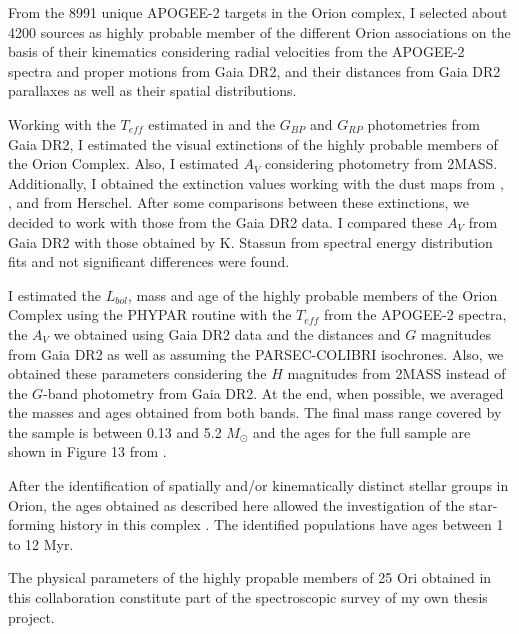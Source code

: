 \documentclass[12pt]{article}
\begin{document}
From the 8991 unique APOGEE-2 targets in the Orion complex, I selected about 4200 sources as highly probable member of the different Orion associations on the basis of their kinematics considering radial velocities from the APOGEE-2 spectra \citep{Kounkel2018} and proper motions from Gaia DR2, and their distances from Gaia DR2 parallaxes as well as their spatial distributions.

Working with the $T_{eff}$ estimated in \citet{Kounkel2018} and the $G_{BP}$ and $G_{RP}$ photometries from Gaia DR2, I estimated the visual extinctions of the highly probable members of the Orion Complex. Also, I estimated $A_V$ considering photometry from 2MASS. Additionally, I obtained the extinction values working with the dust maps from \citet{Schlegel1998}, \citet{Gontcharov2017}, \citet{Green2018} and from Herschel. After some comparisons between these extinctions, we decided to work with those from the Gaia DR2 data. I compared these $A_V$ from Gaia DR2 with those obtained by K. Stassun from spectral energy distribution fits and not significant differences were found.

I estimated the $L_{bol}$, mass and age of the highly probable members of the Orion Complex using the PHYPAR routine with the $T_{eff}$ from the APOGEE-2 spectra, the $A_V$ we obtained using Gaia DR2 data and the distances and $G$ magnitudes from Gaia DR2 as well as assuming the PARSEC-COLIBRI isochrones. Also, we obtained these parameters considering the $H$ magnitudes from 2MASS instead of the $G$-band photometry from Gaia DR2. At the end, when possible, we averaged the masses and ages obtained from both bands. The final mass range covered by the sample is between 0.13 and 5.2 $M_\odot$ and the ages for the full sample are shown in Figure 13 from \citet{Kounkel2018}. 

After the identification of spatially and/or kinematically distinct stellar groups in Orion, the ages obtained as described here allowed the investigation of the star-forming history in this complex \citep{Kounkel2018}. The identified populations have ages between 1 to 12 Myr.

The physical parameters of the highly propable members of 25 Ori obtained in this collaboration constitute part of the spectroscopic survey of my own thesis project.
\end{document}
